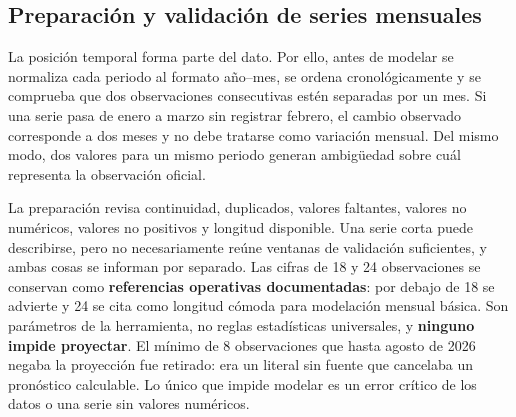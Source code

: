 \documentclass[12pt,letterpaper]{article}
\begin{document}
\subsection{Preparación y validación de series mensuales}

La posición temporal forma parte del dato. Por ello, antes de modelar se normaliza cada periodo al formato año--mes, se ordena cronológicamente y se comprueba que dos observaciones consecutivas estén separadas por un mes. Si una serie pasa de enero a marzo sin registrar febrero, el cambio observado corresponde a dos meses y no debe tratarse como variación mensual. Del mismo modo, dos valores para un mismo periodo generan ambigüedad sobre cuál representa la observación oficial.

La preparación revisa continuidad, duplicados, valores faltantes, valores no numéricos, valores no positivos y longitud disponible. Una serie corta puede describirse, pero no necesariamente reúne ventanas de validación suficientes, y ambas cosas se informan por separado. Las cifras de 18 y 24 observaciones se conservan como \textbf{referencias operativas documentadas}: por debajo de 18 se advierte y 24 se cita como longitud cómoda para modelación mensual básica. Son parámetros de la herramienta, no reglas estadísticas universales, y \textbf{ninguno impide proyectar}. El mínimo de 8 observaciones que hasta agosto de 2026 negaba la proyección fue retirado: era un literal sin fuente que cancelaba un pronóstico calculable. Lo único que impide modelar es un error crítico de los datos o una serie sin valores numéricos.
\end{document}
